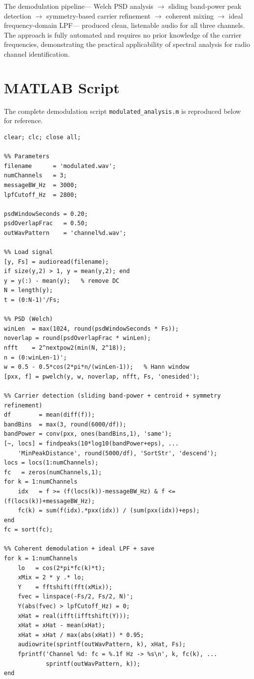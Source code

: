 \documentclass[12pt, a4paper]{article}
\begin{document}
The demodulation pipeline---%
Welch PSD analysis $\to$ sliding band-power peak detection $\to$
symmetry-based carrier refinement $\to$ coherent mixing $\to$
ideal frequency-domain LPF---%
produced clean, listenable audio for all three channels. The approach is
fully automated and requires no prior knowledge of the carrier frequencies,
demonstrating the practical applicability of spectral analysis for
radio channel identification.

\section{MATLAB Script}

The complete demodulation script \texttt{modulated\_analysis.m} is reproduced
below for reference.

\begin{lstlisting}[caption={\texttt{modulated\_analysis.m} -- Full demodulation script},
                   label={lst:full},basicstyle=\ttfamily\scriptsize]
%% CMPE362 HW5 - DSBAM (DSB-SC) Multi-Channel Demodulation
clear; clc; close all;

%% Parameters
filename      = 'modulated.wav';
numChannels   = 3;
messageBW_Hz  = 3000;
lpfCutoff_Hz  = 2800;

psdWindowSeconds = 0.20;
psdOverlapFrac   = 0.50;
outWavPattern    = 'channel%d.wav';

%% Load signal
[y, Fs] = audioread(filename);
if size(y,2) > 1, y = mean(y,2); end
y = y(:) - mean(y);   % remove DC
N = length(y);
t = (0:N-1)'/Fs;

%% PSD (Welch)
winLen  = max(1024, round(psdWindowSeconds * Fs));
noverlap = round(psdOverlapFrac * winLen);
nfft    = 2^nextpow2(min(N, 2^18));
n = (0:winLen-1)';
w = 0.5 - 0.5*cos(2*pi*n/(winLen-1));   % Hann window
[pxx, f] = pwelch(y, w, noverlap, nfft, Fs, 'onesided');

%% Carrier detection (sliding band-power + centroid + symmetry refinement)
df        = mean(diff(f));
bandBins  = max(3, round(6000/df));
bandPower = conv(pxx, ones(bandBins,1), 'same');
[~, locs] = findpeaks(10*log10(bandPower+eps), ...
    'MinPeakDistance', round(5000/df), 'SortStr', 'descend');
locs = locs(1:numChannels);
fc   = zeros(numChannels,1);
for k = 1:numChannels
    idx   = f >= (f(locs(k))-messageBW_Hz) & f <= (f(locs(k))+messageBW_Hz);
    fc(k) = sum(f(idx).*pxx(idx)) / (sum(pxx(idx))+eps);
end
fc = sort(fc);

%% Coherent demodulation + ideal LPF + save
for k = 1:numChannels
    lo   = cos(2*pi*fc(k)*t);
    xMix = 2 * y .* lo;
    Y    = fftshift(fft(xMix));
    fvec = linspace(-Fs/2, Fs/2, N)';
    Y(abs(fvec) > lpfCutoff_Hz) = 0;
    xHat = real(ifft(ifftshift(Y)));
    xHat = xHat - mean(xHat);
    xHat = xHat / max(abs(xHat)) * 0.95;
    audiowrite(sprintf(outWavPattern, k), xHat, Fs);
    fprintf('Channel %d: fc = %.1f Hz -> %s\n', k, fc(k), ...
            sprintf(outWavPattern, k));
end
\end{lstlisting}
\end{document}
